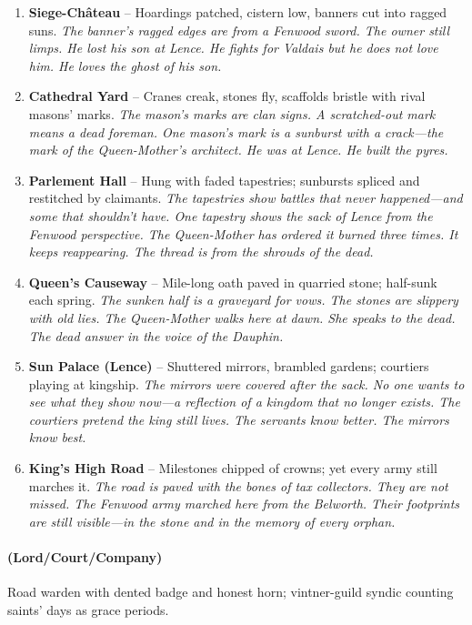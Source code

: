 \begin{enumerate}
\item \textbf{Siege-Château} -- Hoardings patched, cistern low, banners cut into ragged suns.
  \hfill \textit{The banner's ragged edges are from a Fenwood sword. The owner still limps. He lost his son at Lence. He fights for Valdais but he does not love him. He loves the ghost of his son.}
\item \textbf{Cathedral Yard} -- Cranes creak, stones fly, scaffolds bristle with rival masons' marks.
  \hfill \textit{The mason's marks are clan signs. A scratched-out mark means a dead foreman. One mason's mark is a sunburst with a crack---the mark of the Queen-Mother's architect. He was at Lence. He built the pyres.}
\item[J] \textbf{Parlement Hall} -- Hung with faded tapestries; sunbursts spliced and restitched by claimants.
  \hfill \textit{The tapestries show battles that never happened---and some that shouldn't have. One tapestry shows the sack of Lence from the Fenwood perspective. The Queen-Mother has ordered it burned three times. It keeps reappearing. The thread is from the shrouds of the dead.}
\item[Q] \textbf{Queen's Causeway} -- Mile-long oath paved in quarried stone; half-sunk each spring.
  \hfill \textit{The sunken half is a graveyard for vows. The stones are slippery with old lies. The Queen-Mother walks here at dawn. She speaks to the dead. The dead answer in the voice of the Dauphin.}
\item[K] \textbf{Sun Palace (Lence)} -- Shuttered mirrors, brambled gardens; courtiers playing at kingship.
  \hfill \textit{The mirrors were covered after the sack. No one wants to see what they show now---a reflection of a kingdom that no longer exists. The courtiers pretend the king still lives. The servants know better. The mirrors know best.}
\item[A] \textbf{King's High Road} -- Milestones chipped of crowns; yet every army still marches it.
  \hfill \textit{The road is paved with the bones of tax collectors. They are not missed. The Fenwood army marched here from the Belworth. Their footprints are still visible---in the stone and in the memory of every orphan.}
\end{enumerate}

\paragraph*{(Lord/Court/Company)} Road warden with dented badge and honest horn; vintner-guild syndic counting saints' days as grace periods.

